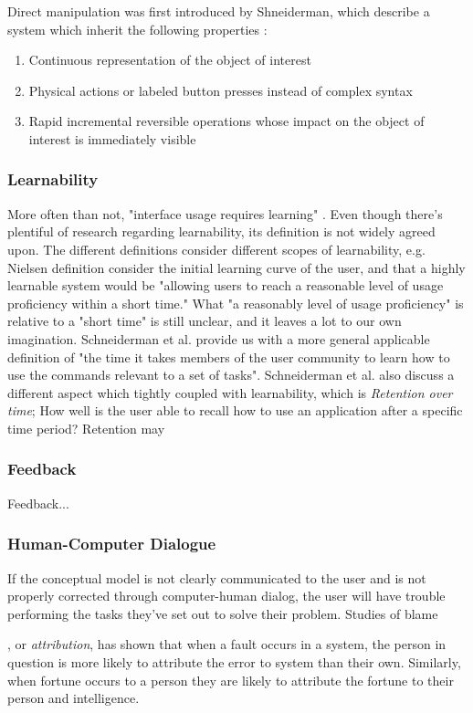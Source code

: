 Direct manipulation was first introduced by Shneiderman, which describe a system which inherit the following properties \cite{Norman2013a}:

\begin{enumerate}
  \item Continuous representation of the object of interest
  \item Physical actions or labeled button presses instead of complex syntax
  \item Rapid incremental reversible operations whose impact on the object of interest is immediately visible
\end{enumerate}

\subsubsection{Learnability}
More often than not, "interface usage requires learning" \cite{Grossman2009}. Even though there’s plentiful of research regarding learnability, its definition is not widely agreed upon. The different definitions consider different scopes of learnability, e.g. Nielsen definition consider the initial learning curve of the user, and that a highly learnable system would be "allowing users to reach a reasonable level of usage proficiency within a short time." What "a reasonably level of usage proficiency" is relative to a "short time" is still unclear, and it leaves a lot to our own imagination. Schneiderman et al. provide us with a more general applicable definition of "the time it takes members of the user community to learn how to use the commands relevant to a set of tasks". Schneiderman et al. also discuss a different aspect which tightly coupled with learnability, which is \textit{Retention over time}; How well is the user able to recall how to use an application after a specific time period? Retention may

\subsubsection{Feedback}
Feedback...

\subsubsection{Human-Computer Dialogue}

If the conceptual model is not clearly communicated to the user and is not properly corrected through computer-human dialog, the user will have trouble performing the tasks they've set out to solve their problem. Studies of blame , or \textit{attribution}, has shown that when a fault occurs in a system, the person in question is more likely to attribute the error to system than their own. Similarly, when fortune occurs to a person they are likely to attribute the fortune to their person and intelligence.

